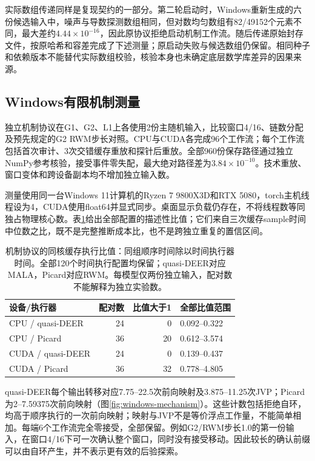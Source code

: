 实际数组传递同样是复现契约的一部分。第二轮启动时，Windows重新生成的六份候选输入中，噪声与导数探测数组相同，但对数均匀数组有82/49152个元素不同，最大差约$4.44\times10^{-16}$，因此原协议拒绝启动机制工作流。随后传递原始封存文件，按原哈希和容差完成了下述测量；原启动失败与候选数组仍保留。相同种子和依赖版本不能替代实际数组校验，核验本身也未确定底层数学库差异的因果来源。

\subsection{Windows有限机制测量}
\label{sec:windows-mechanism}
独立机制协议在G1、G2、L1上各使用2份主随机输入，比较窗口4/16、链数分配及预先规定的G2 RWM步长对照。CPU与CUDA各完成96个工作流；每个工作流包括首次审计、3次交错缓存重放和探针后重放。全部960份保存路径通过独立NumPy参考核验，接受事件零失配，最大绝对路径差为$3.84\times10^{-10}$。技术重放、窗口变体和跨设备副本均不增加独立输入数。

测量使用同一台Windows 11计算机的Ryzen 7 9800X3D和RTX 5080，torch主机线程设为4，CUDA使用float64并显式同步。桌面显示负载仍存在，不将线程数等同独占物理核心数。表\ref{tab:windows-mechanism}给出全部配置的描述性比值；它们来自三次缓存sample时间中位数之比，既不是完整推断成本比，也不是跨独立重复的置信区间。

\begin{table}[htbp]\centering\small
\begin{tabular}{lrrl}\toprule
设备/执行器 & 配对数 & 比值大于1 & 全部比值范围\\\midrule
CPU / quasi-DEER & 24 & 0 & 0.092--0.322 \\
CPU / Picard & 36 & 20 & 0.612--3.574 \\
CUDA / quasi-DEER & 24 & 0 & 0.139--0.437 \\
CUDA / Picard & 36 & 32 & 0.778--4.805 \\
\bottomrule\end{tabular}
\caption{机制协议的同核缓存执行比值：同组顺序时间除以时间执行器时间。全部120个时间执行配置均保留；quasi-DEER对应MALA，Picard对应RWM。每模型仅两份独立输入，配对数不能解释为独立实验数。}
\label{tab:windows-mechanism}
\end{table}

quasi-DEER每个输出转移对应7.75--22.5次前向映射及3.875--11.25次JVP；Picard为2--7.59375次前向映射（图\ref{fig:windows-mechanism}）。这些计数包括拒绝自环，均高于顺序执行的一次前向映射；映射与JVP不是等价浮点工作量，不能简单相加。每端6个工作流完全零接受，全部保留。例如G2/RWM步长1.0的第一份输入，在窗口4/16下可一次确认整个窗口，同时没有接受移动。因此较长的确认前缀可以由自环产生，并不表示更有效的后验探索。

